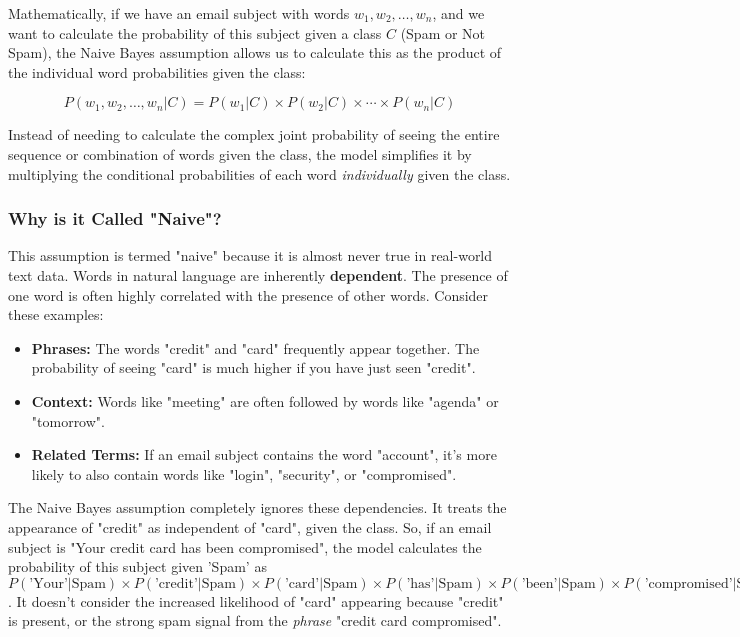 \documentclass[12pt,a4paper]{article}
\begin{document}
Mathematically, if we have an email subject with words $w_1, w_2, \ldots, w_n$, and we want to calculate the probability of this subject given a class $C$ (Spam or Not Spam), the Naive Bayes assumption allows us to calculate this as the product of the individual word probabilities given the class:

\[P(w_1, w_2, \ldots, w_n | C) = P(w_1 | C) \times P(w_2 | C) \times \cdots \times P(w_n | C)\]

Instead of needing to calculate the complex joint probability of seeing the entire sequence or combination of words given the class, the model simplifies it by multiplying the conditional probabilities of each word \textit{individually} given the class.

\subsubsection{Why is it Called "Naive"?}

This assumption is termed "naive" because it is almost never true in real-world text data. Words in natural language are inherently \textbf{dependent}. The presence of one word is often highly correlated with the presence of other words. Consider these examples:

\begin{itemize}
    \item \textbf{Phrases:} The words "credit" and "card" frequently appear together. The probability of seeing "card" is much higher if you have just seen "credit".
    \item \textbf{Context:} Words like "meeting" are often followed by words like "agenda" or "tomorrow".
    \item \textbf{Related Terms:} If an email subject contains the word "account", it's more likely to also contain words like "login", "security", or "compromised".
\end{itemize}

The Naive Bayes assumption completely ignores these dependencies. It treats the appearance of "credit" as independent of "card", given the class. So, if an email subject is "Your credit card has been compromised", the model calculates the probability of this subject given 'Spam' as $P(\text{'Your'}|\text{Spam}) \times P(\text{'credit'}|\text{Spam}) \times P(\text{'card'}|\text{Spam}) \times P(\text{'has'}|\text{Spam}) \times P(\text{'been'}|\text{Spam}) \times P(\text{'compromised'}|\text{Spam})$. It doesn't consider the increased likelihood of "card" appearing because "credit" is present, or the strong spam signal from the \textit{phrase} "credit card compromised".
\end{document}
